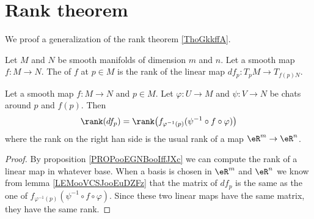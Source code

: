 \section{Rank theorem}

We proof a generalization of the rank theorem \ref{ThoGkkffA}.

\begin{definition}
    Let \( M\) and \( N\) be smooth manifolds of dimension \( m\) and \( n\). Let a smooth map \( f\colon M\to N\). The  of \( f\) at \( p\in M\) is the rank of the linear map \( df_p\colon T_pM\to T_{f(p)N}\).
\end{definition}

\begin{lemma}
    Let a smooth map \( f\colon M\to N\) and \( p\in M\). Let \( \varphi\colon U\to M\) and \( \psi\colon V\to N\) be chats around \( p\) and \( f(p)\). Then
    \begin{equation}
        \rank(df_p)=\rank\big( f_{\varphi^{-1}(p)}(\psi^{-1}\circ f\circ \varphi) \big)
    \end{equation}
    where the rank on the right han side is the usual rank of a map \( \eR^m\to \eR^n\).
\end{lemma}

\begin{proof}
    By proposition \ref{PROPooEGNBooIffJXc} we can compute the rank of a linear map in whatever base. When a basis is chosen in \( \eR^m\) and \( \eR^n\) we know from lemma \ref{LEMooVCSJooEuDZFz} that the matrix of \( df_p\) is the same as the one of \(  f_{\varphi^{-1}(p)}(\psi^{-1}\circ f\circ \varphi) \). Since these two linear maps have the same matrix, they have the same rank.
\end{proof}

